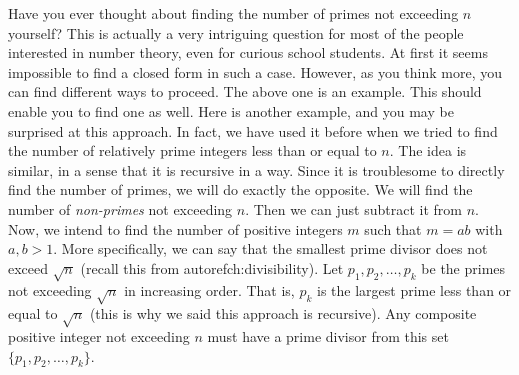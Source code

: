 	Have you ever thought about finding the number of primes not exceeding $n$ yourself? This is actually a very intriguing question for most of the people interested in number theory, even for curious school students. At first it seems impossible to find a closed form in such a case. However, as you think more, you can find different ways to proceed. The above one is an example. This should enable you to find one as well. Here is another example, and you may be surprised at this approach. In fact, we have used it before when we tried to find the number of relatively prime integers less than or equal to $n$. The idea is similar, in a sense that it is recursive in a way. Since it is troublesome to directly find the number of primes, we will do exactly the opposite. We will find the number of \textit{non-primes} not exceeding $n$. Then we can just subtract it from $n$. Now, we intend to find the number of positive integers $m$ such that $m=ab$ with $a,b>1$. More specifically, we can say that the smallest prime divisor does not exceed $\sqrt{n}$ (recall this from autoref{ch:divisibility}). Let $p_1,p_2,\ldots,p_k$ be the primes not exceeding $\sqrt{n}$ in increasing order. That is, $p_k$ is the largest prime less than or equal to $\sqrt{n}$ (this is why we said this approach is recursive). Any composite positive integer not exceeding $n$ must have a prime divisor from this set $\{p_1,p_2,\ldots,p_k\}$.

